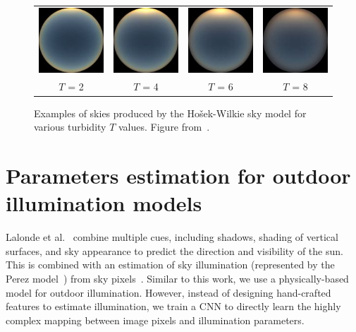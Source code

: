 \begin{figure}
\centering
\begin{tabular}{@{}c@{}c@{}c@{}c@{}}
\includegraphics[width=0.23\linewidth]{3rdparty/hw-004.jpg} &
\includegraphics[width=0.23\linewidth]{3rdparty/hw-005.jpg} &
\includegraphics[width=0.23\linewidth]{3rdparty/hw-006.jpg} &
\includegraphics[width=0.23\linewidth]{3rdparty/hw-007.jpg} \\
$T$ = 2 & $T$ = 4 & $T$ = 6 & $T$ = 8 \\
\end{tabular}
\caption[Examples of skies produced by the Ho\v{s}ek-Wilkie sky model]{Examples of skies produced by the Ho\v{s}ek-Wilkie sky model for various turbidity $T$ values. Figure from~\cite{hosek-siggraph-12}.}
\label{fig:hw_sky_model}
\end{figure}

\section{Parameters estimation for outdoor illumination models}


Lalonde et al.~\cite{lalonde-ijcv-12} combine multiple cues, including shadows, shading of vertical surfaces, and sky appearance to predict the direction and visibility of the sun. This is combined with an estimation of sky illumination (represented by the Perez model~\cite{perez1993allweather}) from sky pixels~\cite{lalonde-ijcv-10}. Similar to this work, we use a physically-based model for outdoor illumination. However, instead of designing hand-crafted features to estimate illumination, we train a CNN to directly learn the highly complex mapping between image pixels and illumination parameters. 


